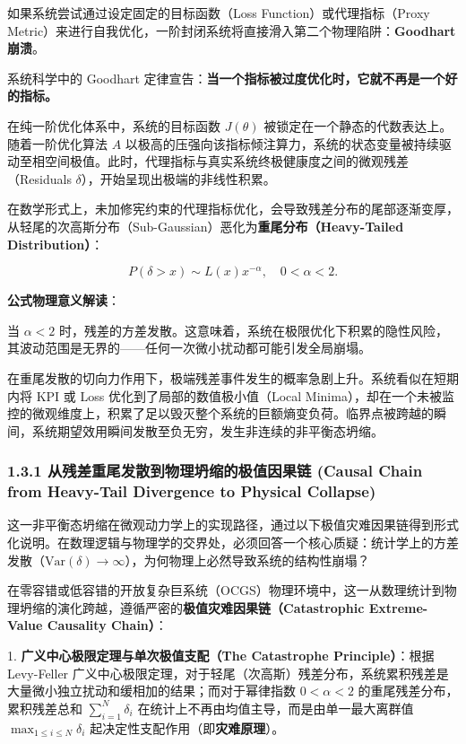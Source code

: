 \documentclass[11pt,a4paper,oneside]{ctexart}
\begin{document}
如果系统尝试通过设定固定的目标函数（Loss Function）或代理指标（Proxy Metric）来进行自我优化，一阶封闭系统将直接滑入第二个物理陷阱：\textbf{Goodhart 崩溃}。


系统科学中的 Goodhart 定律宣告：\textbf{当一个指标被过度优化时，它就不再是一个好的指标。}


在纯一阶优化体系中，系统的目标函数 $J(\theta)$ 被锁定在一个静态的代数表达上。随着一阶优化算法 $A$ 以极高的压强向该指标倾注算力，系统的状态变量被持续驱动至相空间极值。此时，代理指标与真实系统终极健康度之间的微观残差（Residuals $\delta$），开始呈现出极端的非线性积累。


在数学形式上，未加修宪约束的代理指标优化，会导致残差分布的尾部逐渐变厚，从轻尾的次高斯分布（Sub-Gaussian）恶化为\textbf{重尾分布（Heavy-Tailed Distribution）}：


\begin{equation}
P(\delta > x) \sim L(x) x^{-\alpha}, \quad 0 < \alpha < 2.
\end{equation}

\begin{notebox}
\textbf{公式物理意义解读}：

当 $\alpha < 2$ 时，残差的方差发散。这意味着，系统在极限优化下积累的隐性风险，其波动范围是无界的------任何一次微小扰动都可能引发全局崩塌。
\end{notebox}

在重尾发散的切向力作用下，极端残差事件发生的概率急剧上升。系统看似在短期内将 KPI 或 Loss 优化到了局部的数值极小值（Local Minima），却在一个未被监控的微观维度上，积累了足以毁灭整个系统的巨额熵变负荷。临界点被跨越的瞬间，系统期望效用瞬间发散至负无穷，发生非连续的非平衡态坍缩。


\subsubsection{1.3.1 从残差重尾发散到物理坍缩的极值因果链 (Causal Chain from Heavy-Tail Divergence to Physical Collapse)}

这一非平衡态坍缩在微观动力学上的实现路径，通过以下极值灾难因果链得到形式化说明。在数理逻辑与物理学的交界处，必须回答一个核心质疑：\textit{}统计学上的方差发散（$\text{Var}(\delta) \to \infty$），为何物理上必然导致系统的结构性崩塌？\textit{}


在零容错或低容错的开放复杂巨系统（OCGS）物理环境中，这一从数理统计到物理坍缩的演化跨越，遵循严密的\textbf{极值灾难因果链（Catastrophic Extreme-Value Causality Chain）}：


1. \textbf{广义中心极限定理与单次极值支配（The Catastrophe Principle）}：根据 Levy-Feller 广义中心极限定理，对于轻尾（次高斯）残差分布，系统累积残差是大量微小独立扰动和缓相加的结果；而对于幂律指数 $0 < \alpha < 2$ 的重尾残差分布，累积残差总和 $\sum_{i=1}^{N} \delta_i$ 在统计上不再由均值主导，而是由单一最大离群值 $\max_{1 \le i \le N} \delta_i$ 起决定性支配作用（即\textbf{灾难原理}）。
\end{document}
